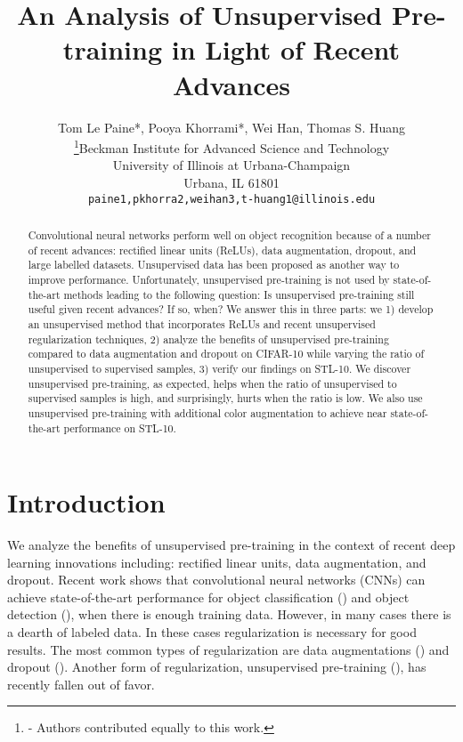 \documentclass{article} \usepackage{iclr2015,times}
\title{An Analysis of Unsupervised Pre-training in Light of Recent Advances}
\author{
Tom Le Paine*, Pooya Khorrami*, Wei Han, Thomas S. Huang \\ \thanks{ - Authors contributed equally to this work.}Beckman Institute for Advanced Science and Technology\\
University of Illinois at Urbana-Champaign\\
Urbana, IL 61801\\
\texttt{{paine1,pkhorra2,weihan3,t-huang1}@illinois.edu} \\
}
\begin{document}
\maketitle

\begin{abstract}
Convolutional neural networks perform well on object recognition because of a number of recent advances: rectified linear units (ReLUs), data augmentation, dropout, and large labelled datasets. Unsupervised data has been proposed as another way to improve performance. Unfortunately, unsupervised pre-training is not used by state-of-the-art methods leading to the following question: Is unsupervised pre-training still useful given recent advances? If so, when? We answer this in three parts: we 1) develop an unsupervised method that incorporates ReLUs and recent unsupervised regularization techniques, 2) analyze the benefits of unsupervised pre-training compared to data augmentation and dropout on CIFAR-10 while varying the ratio of unsupervised to supervised samples, 3) verify our findings on STL-10. 
We discover unsupervised pre-training, as expected, helps when the ratio of unsupervised to supervised samples is high, and surprisingly, hurts when the ratio is low. We also use unsupervised pre-training with additional color augmentation to achieve near state-of-the-art performance on STL-10.

\end{abstract}


\section{Introduction}
\label{sec:intro}
We analyze the benefits of unsupervised pre-training in the context of recent deep learning innovations including: rectified linear units, data augmentation, and dropout. Recent work shows that convolutional neural networks (CNNs) can achieve state-of-the-art performance for object classification (\citet{krizhevsky2012imagenet}) and object detection (\citet{girshick2013rich}), when there is enough training data. However, in many cases there is a dearth of labeled data. In these cases regularization is necessary for good results. The most common types of regularization are data augmentations (\citet{krizhevsky2012imagenet, dosovitskiy2014discriminative}) and dropout (\citet{hinton2012improving}). Another form of regularization, unsupervised pre-training (\citet{hinton2006fast, bengio2007greedy, erhan2010does}), has recently fallen out of favor. 
\end{document}
